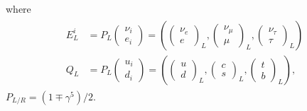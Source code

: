 where 
\begin{eqnarray}
\begin{aligned} E_{L}^{i} &=P_{L}\left(\begin{array}{c}{\nu_{i}} \\ {e_{i}}\end{array}\right)=\left(\left(\begin{array}{c}{\nu_{e}} \\ {e}\end{array}\right)_{L},\left(\begin{array}{c}{\nu_{\mu}} \\ {\mu}\end{array}\right)_{L},\left(\begin{array}{c}{\nu_{\tau}} \\ {\tau}\end{array}\right)_{L}\right) \\ Q_{L} &=P_{L}\left(\begin{array}{c}{u_{i}} \\ {d_{i}}\end{array}\right)=\left(\left(\begin{array}{c}{u} \\ {d}\end{array}\right)_{L},\left(\begin{array}{c}{c} \\ {s}\end{array}\right)_{L},\left(\begin{array}{c}{t} \\ {b}\end{array}\right)_{L}\right), \end{aligned}
\end{eqnarray}
$P_{L / R}=\left(1 \mp \gamma^{5}\right) / 2$.\\
